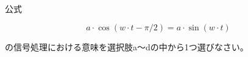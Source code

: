 公式

\[
a \cdot \cos( w\cdot t - \pi/2) = a \cdot \sin( w\cdot t )
\]

\noindent の信号処理における意味を選択肢a〜dの中から1つ選びなさい。
